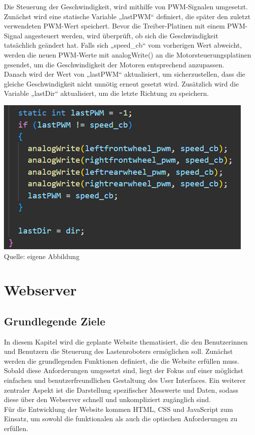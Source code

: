 \documentclass[ngerman,12pt,a4paper]{article}
\begin{document}
	Die Steuerung der Geschwindigkeit, wird mithilfe von PWM-Signalen umgesetzt. Zunächst wird eine statische Variable „lastPWM“ definiert, die später den zuletzt verwendeten PWM-Wert speichert. Bevor die Treiber-Platinen mit einem PWM-Signal angesteuert werden, wird überprüft, ob sich die Geschwindigkeit tatsächlich geändert hat. Falls sich „speed\_cb“ vom vorherigen Wert abweicht, werden die neuen PWM-Werte mit analogWrite() an die Motorsteuerungsplatinen gesendet, um die Geschwindigkeit der Motoren entsprechend anzupassen. \\
	\newpage 	\noindent
	Danach wird der Wert von „lastPWM“ aktualisiert, um sicherzustellen, dass die gleiche Geschwindigkeit nicht unnötig erneut gesetzt wird. Zusätzlich wird die Variable „lastDir“ aktualisiert, um die letzte Richtung zu speichern. \\[0.5cm]
	\begin{minipage}{\textwidth}
		\centering
		\includegraphics[scale=1.2]{Pictures/code_analogWrite_pwm_motoren}
		\label{fig:code_analogWrite_pwm_motoren}
		\vspace{-2pt}
		\small Quelle: eigene Abbildung
		\vspace{10pt}
	\end{minipage}
	\newpage
	\section{Webserver} %
	 
		\subsection{Grundlegende Ziele}
	In diesem Kapitel wird die geplante Website thematisiert, die den Benutzerinnen und Benutzern die Steuerung des Lastenroboters ermöglichen soll. Zunächst werden die grundlegenden Funktionen definiert, die die Website erfüllen muss. Sobald diese Anforderungen umgesetzt sind, liegt der Fokus auf einer möglichst einfachen und benutzerfreundlichen Gestaltung des User Interfaces. Ein weiterer zentraler Aspekt ist die Darstellung spezifischer Messwerte und Daten, sodass diese über den Webserver schnell und unkompliziert zugänglich sind. \\[0.5cm]
	Für die Entwicklung der Website kommen HTML, CSS und JavaScript zum Einsatz, um sowohl die funktionalen als auch die optischen Anforderungen zu erfüllen. 
	
\end{document}

